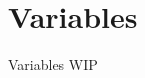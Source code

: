 \documentclass[../../UsabilityReport.tex]{subfiles}
\begin{document}
\section{Variables}
	Variables WIP
\end{document}
